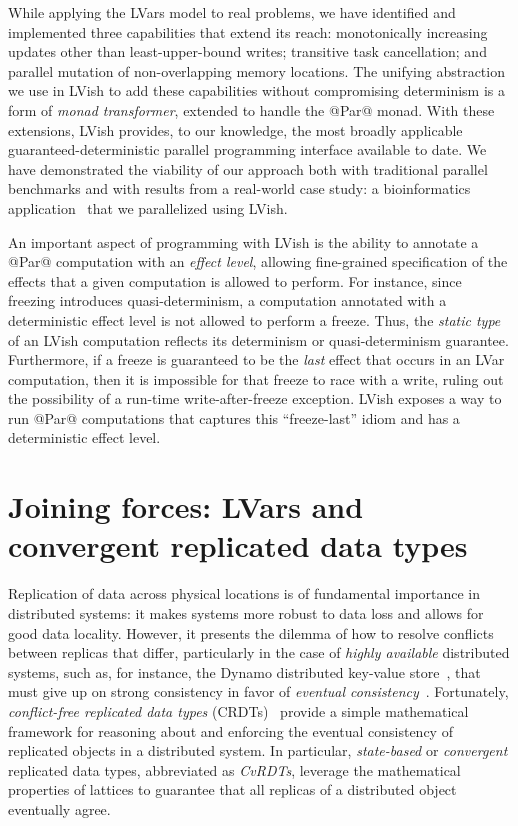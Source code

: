 \documentclass{article}
\begin{document}
While applying the LVars model to real problems, we have identified
and implemented three capabilities that extend its reach:
monotonically increasing updates other than least-upper-bound writes;
transitive task cancellation; and parallel mutation of non-overlapping
memory locations. The unifying abstraction we use in LVish to add
these capabilities without compromising determinism is a form of
\emph{monad transformer}, extended to handle the @Par@ monad.  With
these extensions, LVish provides, to our knowledge, the most broadly
applicable guaranteed-deterministic parallel programming interface
available to date. We have demonstrated the viability of our approach
both with traditional parallel benchmarks and with results from a
real-world case study: a bioinformatics application~\cite{phybin} that
we parallelized using LVish.

An important aspect of programming with LVish is the ability to
annotate a @Par@ computation with an \emph{effect level}, allowing
fine-grained specification of the effects that a given computation is
allowed to perform.  For instance, since freezing introduces
quasi-determinism, a computation annotated with a deterministic effect
level is not allowed to perform a freeze.  Thus, the \emph{static
  type} of an LVish computation reflects its determinism or
quasi-determinism guarantee.  Furthermore, if a freeze is guaranteed
to be the \emph{last} effect that occurs in an LVar computation, then
it is impossible for that freeze to race with a write, ruling out the
possibility of a run-time write-after-freeze exception.  LVish exposes
a way to run @Par@ computations that captures this ``freeze-last''
idiom and has a deterministic effect level.

\section{Joining forces: LVars and convergent replicated data types}\label{crdts}

Replication of data across physical locations is of fundamental
importance in distributed systems: it makes systems more robust to
data loss and allows for good data locality.  However, it presents the
dilemma of how to resolve conflicts between replicas that differ,
particularly in the case of \emph{highly available} distributed
systems, such as, for instance, the Dynamo distributed key-value
store~\cite{dynamo}, that must give up on strong consistency in favor
of \emph{eventual consistency}~\cite{vogels-ec}.  Fortunately,
\emph{conflict-free replicated data types} (CRDTs)~\cite{crdts}
provide a simple mathematical framework for reasoning about and
enforcing the eventual consistency of replicated objects in a
distributed system.  In particular, \emph{state-based} or
\emph{convergent} replicated data types, abbreviated as \emph{CvRDTs},
leverage the mathematical properties of lattices to guarantee that all
replicas of a distributed object eventually agree.
\end{document}
